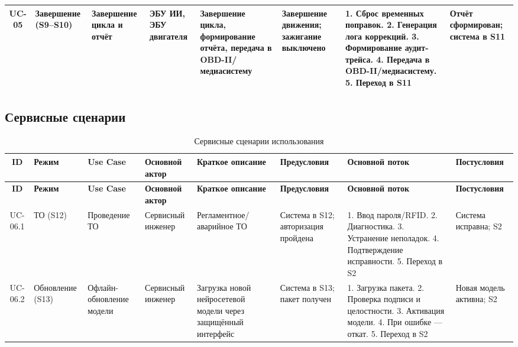 \documentclass[14pt, a4paper]{extarticle}
\begin{document}
{\begin{xltabular}{\textwidth}{|c|L|L|L|L|L|L|L|}
						\hline
						UC-05 & Завершение (S9–S10) & Завершение цикла и отчёт & ЭБУ ИИ, ЭБУ двигателя & Завершение цикла, формирование отчёта, передача в OBD-II/медиасистему & Завершение движения; зажигание выключено & 1. Сброс временных поправок. 2. Генерация лога коррекций. 3. Формирование аудит-трейса. 4. Передача в OBD-II/медиасистему. 5. Переход в S11 & Отчёт сформирован; система в S11 \\
						\hline
					\end{xltabular}}
					
				\subsection{Сервисные сценарии}
					{\fontsize{9}{11}\selectfont
						\begin{xltabular}{\textwidth}{|c|L|L|L|L|L|L|L|}
						\caption{Сервисные сценарии использования}\label{tab:usecases-service}\\
						\hline
						\textbf{ID} & \textbf{Режим} & \textbf{Use Case} & \textbf{Основной актор} & \textbf{Краткое описание} & \textbf{Предусловия} & \textbf{Основной поток} & \textbf{Постусловия} \\
						\hline
						\endfirsthead
						\hline
						\textbf{ID} & \textbf{Режим} & \textbf{Use Case} & \textbf{Основной актор} & \textbf{Краткое описание} & \textbf{Предусловия} & \textbf{Основной поток} & \textbf{Постусловия} \\
						\hline
						\endhead
						\hline
						\endfoot
						\hline
						\endlastfoot
						UC-06.1 & ТО (S12) & Проведение ТО & Сервисный инженер & Регламентное/аварийное ТО & Система в S12; авторизация пройдена & 1. Ввод пароля/RFID. 2. Диагностика. 3. Устранение неполадок. 4. Подтверждение исправности. 5. Переход в S2 & Система исправна; S2 \\
						\hline
						UC-06.2 & Обновление (S13) & Офлайн-обновление модели & Сервисный инженер & Загрузка новой нейросетевой модели через защищённый интерфейс & Система в S13; пакет получен & 1. Загрузка пакета. 2. Проверка подписи и целостности. 3. Активация модели. 4. При ошибке — откат. 5. Переход в S2 & Новая модель активна; S2 \\
						\hline
					\end{xltabular}}
					
\end{document}
